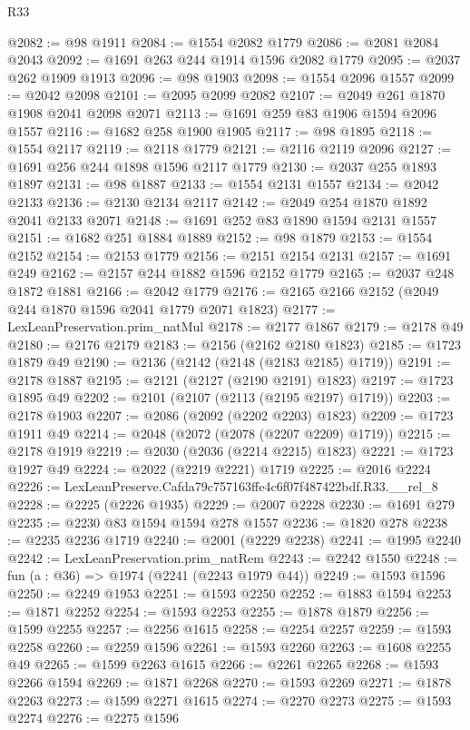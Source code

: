 \begin{lexlean}{R33}
\begin{coremodule}
@2082 := @98 @1911
@2084 := @1554 @2082 @1779
@2086 := @2081 @2084 @2043
@2092 := @1691 @263 @244 @1914 @1596 @2082 @1779
@2095 := @2037 @262 @1909 @1913
@2096 := @98 @1903
@2098 := @1554 @2096 @1557
@2099 := @2042 @2098
@2101 := @2095 @2099 @2082
@2107 := @2049 @261 @1870 @1908 @2041 @2098 @2071
@2113 := @1691 @259 @83 @1906 @1594 @2096 @1557
@2116 := @1682 @258 @1900 @1905
@2117 := @98 @1895
@2118 := @1554 @2117
@2119 := @2118 @1779
@2121 := @2116 @2119 @2096
@2127 := @1691 @256 @244 @1898 @1596 @2117 @1779
@2130 := @2037 @255 @1893 @1897
@2131 := @98 @1887
@2133 := @1554 @2131 @1557
@2134 := @2042 @2133
@2136 := @2130 @2134 @2117
@2142 := @2049 @254 @1870 @1892 @2041 @2133 @2071
@2148 := @1691 @252 @83 @1890 @1594 @2131 @1557
@2151 := @1682 @251 @1884 @1889
@2152 := @98 @1879
@2153 := @1554 @2152
@2154 := @2153 @1779
@2156 := @2151 @2154 @2131
@2157 := @1691 @249
@2162 := @2157 @244 @1882 @1596 @2152 @1779
@2165 := @2037 @248 @1872 @1881
@2166 := @2042 @1779
@2176 := @2165 @2166 @2152 (@2049 @244 @1870 @1596 @2041 @1779 @2071 @1823)
@2177 := LexLeanPreservation.prim_natMul
@2178 := @2177 @1867
@2179 := @2178 @49
@2180 := @2176 @2179
@2183 := @2156 (@2162 @2180 @1823)
@2185 := @1723 @1879 @49
@2190 := @2136 (@2142 (@2148 (@2183 @2185) @1719))
@2191 := @2178 @1887
@2195 := @2121 (@2127 (@2190 @2191) @1823)
@2197 := @1723 @1895 @49
@2202 := @2101 (@2107 (@2113 (@2195 @2197) @1719))
@2203 := @2178 @1903
@2207 := @2086 (@2092 (@2202 @2203) @1823)
@2209 := @1723 @1911 @49
@2214 := @2048 (@2072 (@2078 (@2207 @2209) @1719))
@2215 := @2178 @1919
@2219 := @2030 (@2036 (@2214 @2215) @1823)
@2221 := @1723 @1927 @49
@2224 := @2022 (@2219 @2221) @1719
@2225 := @2016 @2224
@2226 := LexLeanPreserve.Cafda79c757163ffe4c6f07f487422bdf.R33.__rel_8
@2228 := @2225 (@2226 @1935)
@2229 := @2007 @2228
@2230 := @1691 @279
@2235 := @2230 @83 @1594 @1594 @278 @1557
@2236 := @1820 @278
@2238 := @2235 @2236 @1719
@2240 := @2001 (@2229 @2238)
@2241 := @1995 @2240
@2242 := LexLeanPreservation.prim_natRem
@2243 := @2242 @1550
@2248 := fun (a : @36) => @1974 (@2241 (@2243 @1979 @44))
@2249 := @1593 @1596
@2250 := @2249 @1953
@2251 := @1593 @2250
@2252 := @1883 @1594
@2253 := @1871 @2252
@2254 := @1593 @2253
@2255 := @1878 @1879
@2256 := @1599 @2255
@2257 := @2256 @1615
@2258 := @2254 @2257
@2259 := @1593 @2258
@2260 := @2259 @1596
@2261 := @1593 @2260
@2263 := @1608 @2255 @49
@2265 := @1599 @2263 @1615
@2266 := @2261 @2265
@2268 := @1593 @2266 @1594
@2269 := @1871 @2268
@2270 := @1593 @2269
@2271 := @1878 @2263
@2273 := @1599 @2271 @1615
@2274 := @2270 @2273
@2275 := @1593 @2274
@2276 := @2275 @1596

\end{coremodule}
\end{lexlean}
